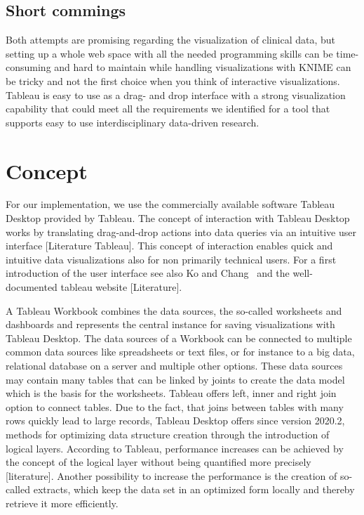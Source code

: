 \documentclass[aac,crcready]{iosart2x}
\begin{document}
\subsection{Short commings}
Both attempts are promising regarding the visualization of clinical data, but setting up a whole web space with all the needed programming skills can be time-consuming and hard to maintain while handling visualizations with KNIME can be tricky and not the first choice when you think of interactive visualizations. Tableau is easy to use as a drag- and drop interface with a strong visualization capability that could meet all the requirements we identified for a tool that supports easy to use interdisciplinary data-driven research.
 
\section{Concept}\label{s3}
%
For our implementation, we use the commercially available software Tableau Desktop provided by Tableau\textregistered. The concept of interaction with Tableau Desktop works by translating drag-and-drop actions into data queries via an intuitive user interface [Literature Tableau]. This concept of interaction enables quick and intuitive data visualizations also for non primarily technical users. For a first introduction of the user interface see also Ko and Chang~\cite{Ko.2017} and the well-documented tableau website [Literature].

A Tableau Workbook combines the data sources, the so-called worksheets and dashboards and represents the central instance for saving visualizations with Tableau Desktop. The data sources of a Workbook can be connected to multiple common data sources like spreadsheets or text files, or for instance to a big data, relational database on a server and multiple other options. These data sources may contain many tables that can be linked by joints to create the data model which is the basis for the worksheets. Tableau offers left, inner and right join option to connect tables. Due to the fact, that joins between tables with many rows quickly lead to large records, Tableau Desktop offers since version 2020.2, methods for optimizing data structure creation through the introduction of logical layers. According to Tableau, performance increases can be achieved by the concept of the logical layer without being quantified more precisely [literature]. Another possibility to increase the performance is the creation of so-called extracts, which keep the data set in an optimized form locally and thereby retrieve it more efficiently.
\end{document}
